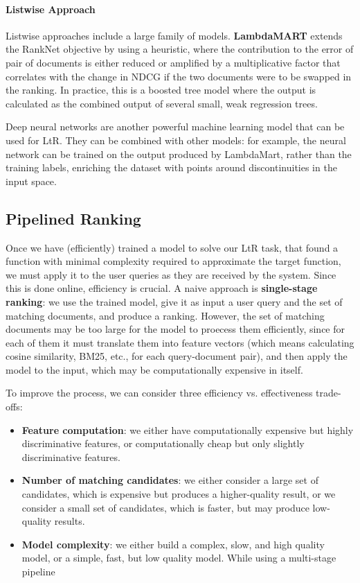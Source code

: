 \paragraph{Listwise Approach}
Listwise approaches include a large family of models. \textbf{LambdaMART} extends the RankNet objective by using a heuristic, where the contribution to the error of pair of documents is either reduced or amplified by a multiplicative factor that correlates with the change in NDCG if the two documents were to be swapped in the ranking. In practice, this is a boosted tree model where the output is calculated as the combined output of several small, weak regression trees.

Deep neural networks are another powerful machine learning model that can be used for LtR. They can be combined with other models: for example, the neural network can be trained on the output produced by LambdaMart, rather than the training labels, enriching the dataset with points around discontinuities in the input space.

\subsection{Pipelined Ranking}
Once we have (efficiently) trained a model to solve our LtR task, that found a function with minimal complexity required to approximate the target function, we must apply it to the user queries as they are received by the system. Since this is done online, efficiency is crucial. A naive approach is \textbf{single-stage ranking}: we use the trained model, give it as input a user query and the set of matching documents, and produce a ranking. However, the set of matching documents may be too large for the model to proecess them efficiently, since for each of them it must translate them into feature vectors (which means calculating cosine similarity, BM25, etc., for each query-document pair), and then apply the model to the input, which may be computationally expensive in itself.

To improve the process, we can consider three efficiency vs. effectiveness trade-offs:
\begin{itemize}
    \item \textbf{Feature computation}: we either have computationally expensive but highly discriminative features, or computationally cheap but only slightly discriminative features. 
 
    \item \textbf{Number of matching candidates}: we either consider a large set of candidates, which is expensive but produces a higher-quality result, or we consider a small set of candidates, which is faster, but may produce low-quality results. 

    \item \textbf{Model complexity}: we either build a complex, slow, and high quality model, or a simple, fast, but low quality model. While using a multi-stage pipeline
\end{itemize}

